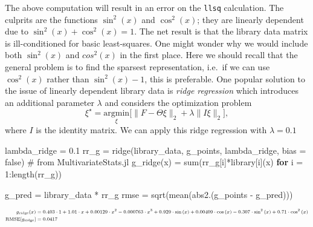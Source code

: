 \documentclass[
]{article}
\newenvironment{Shaded}{\begin{snugshade}}{\end{snugshade}}
\newcommand{\CommentTok}[1]{\textcolor[rgb]{0.37,0.37,0.37}{#1}}
\newcommand{\ConstantTok}[1]{\textcolor[rgb]{0.56,0.35,0.01}{#1}}
\newcommand{\ControlFlowTok}[1]{\textcolor[rgb]{0.00,0.23,0.31}{\textbf{#1}}}
\newcommand{\FloatTok}[1]{\textcolor[rgb]{0.68,0.00,0.00}{#1}}
\newcommand{\FunctionTok}[1]{\textcolor[rgb]{0.28,0.35,0.67}{#1}}
\newcommand{\NormalTok}[1]{\textcolor[rgb]{0.00,0.23,0.31}{#1}}
\newcommand{\OperatorTok}[1]{\textcolor[rgb]{0.37,0.37,0.37}{#1}}
\begin{document}
The above computation will result in an error on the \texttt{llsq}
calculation. The culprits are the functions \(\sin^2(x)\) and
\(\cos^2(x)\); they are linearly dependent due to
\(\sin^2(x) + \cos^2(x) = 1\). The net result is that the library data
matrix is ill-conditioned for basic least-squares. One might wonder why
we would include both \(\sin^2(x)\) and \(cos^2(x)\) in the first place.
Here we should recall that the general problem is to find the sparsest
representation, i.e.~if we can use \(\cos^2(x)\) rather than
\(\sin^2(x) - 1\), this is preferable. One popular solution to the issue
of linearly dependent library data is \emph{ridge regression}
\cite{hoerl1970ridge} which introduces an additional parameter
\(\lambda\) and considers the optimization problem \begin{equation}
\xi^\star = \underset{\xi}{\text{argmin}}\bigg[ \lVert F - \Theta \xi \rVert_{2} + \lambda \lVert I \xi \rVert_{2} \bigg],
\end{equation} where \(I\) is the identity matrix. We can apply this
ridge regression with \(\lambda = 0.1\)

\begin{Shaded}
\begin{Highlighting}[]
\NormalTok{lambda\_ridge }\OperatorTok{=} \FloatTok{0.1}
\NormalTok{rr\_g }\OperatorTok{=} \FunctionTok{ridge}\NormalTok{(library\_data, g\_points, lambda\_ridge, bias }\OperatorTok{=} \ConstantTok{false}\NormalTok{) }\CommentTok{\# from MultivariateStats.jl}
\FunctionTok{g\_ridge}\NormalTok{(x) }\OperatorTok{=} \FunctionTok{sum}\NormalTok{(rr\_g[i]}\OperatorTok{*}\NormalTok{library[i](x) }\ControlFlowTok{for}\NormalTok{ i }\OperatorTok{=} \FloatTok{1}\OperatorTok{:}\FunctionTok{length}\NormalTok{(rr\_g))}

\NormalTok{g\_pred }\OperatorTok{=}\NormalTok{ library\_data }\OperatorTok{*}\NormalTok{ rr\_g}
\NormalTok{rmse }\OperatorTok{=} \FunctionTok{sqrt}\NormalTok{(}\FunctionTok{mean}\NormalTok{(}\FunctionTok{abs2}\NormalTok{.(g\_points }\OperatorTok{{-}}\NormalTok{ g\_pred)))}
\end{Highlighting}
\end{Shaded}

\begin{subequations} \label{eq:g-ridge} \scriptsize \begin{align}    g_{\text{ridge}}(x) &= 0.403 \cdot 1 + 1.01 \cdot x + 0.00129 \cdot x^{2} -0.000763 \cdot x^{3} + 0.929 \cdot \sin\left( x \right) + 0.00409 \cdot \cos\left( x \right) -0.307 \cdot \sin^{2}\left( x \right) + 0.71 \cdot \cos^{2}\left( x \right) \\
    \text{RMSE}[g_{\text{ridge}}] &= 0.0417 \end{align} \end{subequations}
\end{document}
